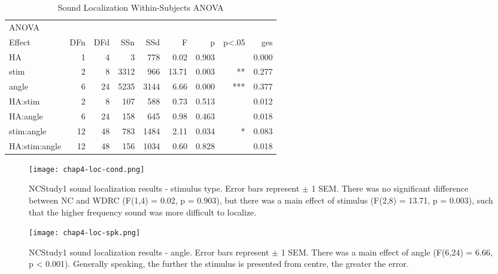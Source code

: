 \begin{table}[h]
\begin{tabular}{lrrrrrrrr}
\hline
ANOVA & & & & & & & & \\
         Effect & DFn & DFd  &    SSn &  SSd   &     F   &  p & p<.05  &  ges \\
            HA &  1 &  4 &   3 & 778 & 0.02 & 0.903  &     & 0.000 \\
          stim &  2 &  8 & 3312 & 966 & 13.71 & 0.003 &    ** & 0.277 \\
         angle &  6 & 24 & 5235 & 3144 & 6.66 & 0.000 &    *** & 0.377 \\
       HA:stim &  2 &  8 & 107 & 588 & 0.73 & 0.513   &    & 0.012 \\
      HA:angle &  6 & 24 & 158 & 645 & 0.98 & 0.463   &    & 0.018 \\
    stim:angle & 12 & 48 & 783 & 1484 & 2.11 & 0.034  &   * & 0.083 \\
 HA:stim:angle & 12 & 48 & 156 & 1034 & 0.60 & 0.828  &    & 0.018 \\
\hline
\end{tabular}
\caption{Sound Localization Within-Subjects ANOVA}
\end{table}

\begin{figure}[htp]
\begin{center}
\texttt{[image: chap4-loc-cond.png]} \\
\caption[NCStudy1 sound localization results - stimulus type]{NCStudy1 sound localization results - stimulus type.  Error bars represent $\pm$ 1 SEM.  There was no significant difference between NC and WDRC (F(1,4) = 0.02, p = 0.903), but there was a main effect of stimulus (F(2,8) = 13.71, p = 0.003), such that the higher frequency sound was more difficult to localize.}
\label{chap4-loc-cond}
\end{center}
\end{figure}

\begin{figure}[htp]
\begin{center}
\texttt{[image: chap4-loc-spk.png]} \\
\caption[NCStudy1 sound localization results - angle]{NCStudy1 sound localization results - angle.  Error bars represent $\pm$ 1 SEM.  There was a main effect of angle (F(6,24) = 6.66, p < 0.001).  Generally speaking, the further the stimulus is presented from centre, the greater the error.}
\label{chap4-loc-spk}
\end{center}
\end{figure}

